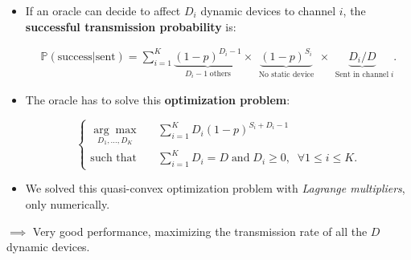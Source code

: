 \begin{frameO}

    \begin{itemize}
        \item
              If an oracle can decide to affect \(D_i\) dynamic devices to channel
              \(i\), the \textbf{successful transmission probability} is:
              \vspace*{-10pt}

              \begin{small} \begin{align*}
                      \mathbb{P}(\text{success}|\text{sent}) = \sum_{i=1}^{K} \underbrace{(1 - p)^{D_i - 1}}_{\;\;D_i - 1 \;\text{others}\;\;} \times \underbrace{(1 - p)^{S_i}}_{\;\;\text{No static device}\;\;} \times \underbrace{ D_i / D }_{\;\;\text{Sent in channel}\; i}.
                  \end{align*} \end{small}
              \pause
        \item
              The oracle has to solve this \textbf{optimization problem}:
              \vspace*{-5pt}

              \begin{small} \begin{equation*} \begin{cases}
                          \underset{D_1,\dots,D_{K}}{\arg\max}\;\;\; & \sum_{i=1}^{K} D_i (1 - p)^{S_i + D_i -1}                                           \\
                          \text{such that}\;\;\;                     & \sum_{i=1}^{K} D_i = D \; \text{and} \; D_i \geq 0, \; \; \forall 1 \leq i \leq K .
                      \end{cases} \end{equation*} \end{small}
        \item
              We solved this quasi-convex optimization problem with \emph{Lagrange
                  multipliers}, only numerically.
    \end{itemize}

    \vfill{}
    \(\implies\) Very good performance, maximizing the transmission rate
    of all the \(D\) dynamic devices.

\end{frameO}

